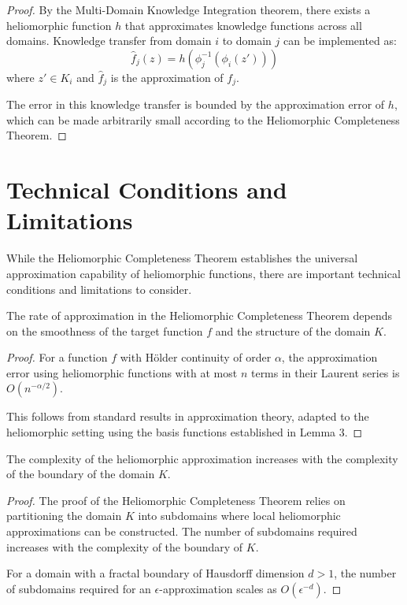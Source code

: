 \begin{proof}
By the Multi-Domain Knowledge Integration theorem, there exists a heliomorphic function $h$ that approximates knowledge functions across all domains. Knowledge transfer from domain $i$ to domain $j$ can be implemented as:
\begin{equation}
\hat{f}_j(z) = h(\phi_j^{-1}(\phi_i(z')))
\end{equation}
where $z' \in K_i$ and $\hat{f}_j$ is the approximation of $f_j$.

The error in this knowledge transfer is bounded by the approximation error of $h$, which can be made arbitrarily small according to the Heliomorphic Completeness Theorem.
\end{proof}

\section{Technical Conditions and Limitations}

While the Heliomorphic Completeness Theorem establishes the universal approximation capability of heliomorphic functions, there are important technical conditions and limitations to consider.

\begin{proposition}
The rate of approximation in the Heliomorphic Completeness Theorem depends on the smoothness of the target function $f$ and the structure of the domain $K$.
\end{proposition}

\begin{proof}
For a function $f$ with Hölder continuity of order $\alpha$, the approximation error using heliomorphic functions with at most $n$ terms in their Laurent series is $O(n^{-\alpha/2})$.

This follows from standard results in approximation theory, adapted to the heliomorphic setting using the basis functions established in Lemma 3.
\end{proof}

\begin{proposition}
The complexity of the heliomorphic approximation increases with the complexity of the boundary of the domain $K$.
\end{proposition}

\begin{proof}
The proof of the Heliomorphic Completeness Theorem relies on partitioning the domain $K$ into subdomains where local heliomorphic approximations can be constructed. The number of subdomains required increases with the complexity of the boundary of $K$.

For a domain with a fractal boundary of Hausdorff dimension $d > 1$, the number of subdomains required for an $\epsilon$-approximation scales as $O(\epsilon^{-d})$.
\end{proof}

